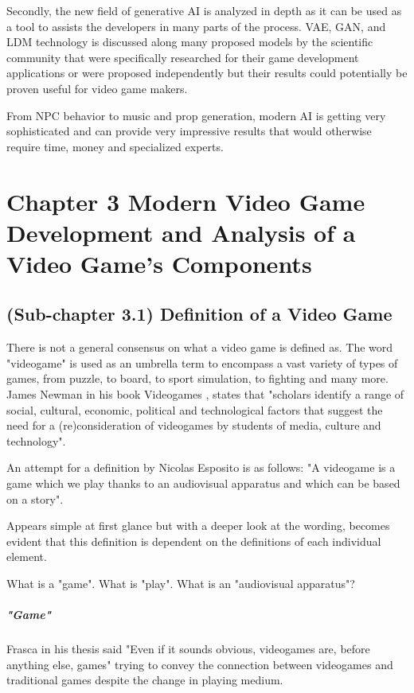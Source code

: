 \documentclass[a4paper,one side,12pt]{book}
\begin{document}
Secondly, the new field of generative AI is analyzed in depth as it can
be used as a tool to assists the developers in many parts of the
process. VAE, GAN, and LDM technology is discussed along many proposed
models by the scientific community that were specifically researched for
their game development applications or were proposed independently but
their results could potentially be proven useful for video game makers.

From NPC behavior to music and prop generation, modern AI is getting
very sophisticated and can provide very impressive results that would
otherwise require time, money and specialized experts.
\pagebreak


\chapter{Chapter 3 Modern Video Game Development and Analysis of a Video Game's Components}


\section{(Sub-chapter 3.1) Definition of a Video Game}

There is not a general consensus on what a video game is defined as. The word "videogame" is used as an umbrella term to encompass a vast
variety of types of games, from puzzle, to board, to sport simulation,
to fighting and many more. James Newman in his book Videogames
\cite{newman_2004_videogames}, states that "scholars identify a range of social, cultural,
economic, political and technological factors that suggest the need for
a (re)consideration of videogames by students of media, culture and
technology".

An attempt for a definition by Nicolas Esposito\cite{esposito_2005_a} is as follows:
"A videogame is a game which we play thanks to an audiovisual apparatus
and which can be based on a story".

Appears simple at first glance but with a deeper look at the wording,
becomes evident that this definition is dependent on the definitions of
each individual element.

What is a "game". What is "play". What is an "audiovisual apparatus"?


\paragraph{"Game"}

Frasca\cite{frasca_2001_videogames} in his thesis said "Even if it sounds obvious,
videogames are, before anything else, games" trying to convey the
connection between videogames and traditional games despite the change
in playing medium.
\end{document}
